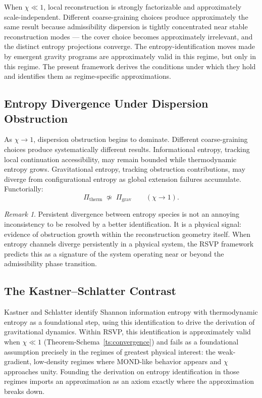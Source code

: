 \documentclass[11pt, a4paper]{article}
\theoremstyle{plain}
\theoremstyle{definition}
\theoremstyle{remark}
\newtheorem{remark}[theorem]{Remark}
\newcommand{\Pitherm}{\Pi_{\mathrm{therm}}}
\newcommand{\Pigrav}{\Pi_{\mathrm{grav}}}
\begin{document}
When $\chi \ll 1$, local reconstruction is strongly factorizable and approximately
scale-independent. Different coarse-graining choices produce approximately the same
result because admissibility dispersion is tightly concentrated near stable
reconstruction modes --- the cover choice becomes approximately irrelevant, and the
distinct entropy projections converge. The entropy-identification moves made by
emergent gravity programs are approximately valid in this regime, but only in this
regime. The present framework derives the conditions under which they hold and
identifies them as regime-specific approximations.

\subsection{Entropy Divergence Under Dispersion Obstruction}

As $\chi \to 1$, dispersion obstruction begins to dominate. Different coarse-graining
choices produce systematically different results. Informational entropy, tracking
local continuation accessibility, may remain bounded while thermodynamic entropy
grows. Gravitational entropy, tracking obstruction contributions, may diverge from
configurational entropy as global extension failures accumulate. Functorially:
\[
  \Pitherm \;\not\simeq\; \Pigrav
  \qquad (\chi \to 1).
\]

\begin{remark}
Persistent divergence between entropy species is not an annoying inconsistency to be
resolved by a better identification. It is a physical signal: evidence of obstruction
growth within the reconstruction geometry itself. When entropy channels diverge
persistently in a physical system, the RSVP framework predicts this as a signature
of the system operating near or beyond the admissibility phase transition.
\end{remark}

\subsection{The Kastner--Schlatter Contrast}

Kastner and Schlatter \cite{kastner2024} identify Shannon information entropy with
thermodynamic entropy as a foundational step, using this identification to drive the
derivation of gravitational dynamics. Within RSVP, this identification is
approximately valid when $\chi \ll 1$ (Theorem-Schema~\ref{ts:convergence}) and
fails as a foundational assumption precisely in the regimes of greatest physical
interest: the weak-gradient, low-density regimes where MOND-like behavior appears
and $\chi$ approaches unity. Founding the derivation on entropy identification in
those regimes imports an approximation as an axiom exactly where the approximation
breaks down.
\end{document}
